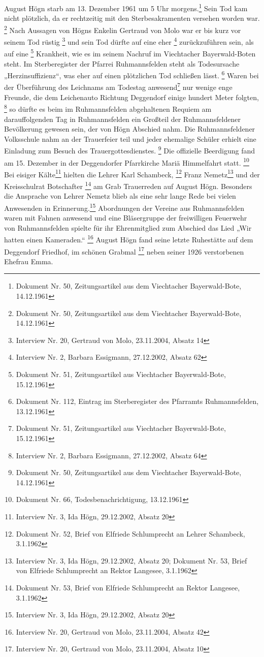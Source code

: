August Högn starb am 13. Dezember 1961 um 5 Uhr morgens.\footnote{
Dokument Nr. 50, Zeitungsartikel aus dem Viechtacher Bayerwald-Bote,
14.12.1961} Sein Tod kam nicht plötzlich, da er rechtzeitig mit den
Sterbesakramenten versehen worden war. \footnote{Dokument Nr. 50,
Zeitungsartikel aus dem Viechtacher Bayerwald-Bote, 14.12.1961} Nach
Aussagen von Högns Enkelin Gertraud von Molo war er bis kurz vor seinem
Tod rüstig \footnote{Interview Nr. 20, Gertraud von Molo, 23.11.2004,
Absatz 14} und sein Tod dürfte auf eine eher  \footnote{Interview Nr. 2, Barbara Essigmann, 27.12.2002,
Absatz 62} zurückzuführen sein, als auf eine   \footnote{Dokument Nr. 51, Zeitungsartikel aus Viechtacher
Bayerwald-Bote, 15.12.1961} Krankheit, wie es im seinem Nachruf im
Viechtacher Bayerwald-Boten steht. Im Sterberegister der Pfarrei
Ruhmannsfelden steht als Todesursache „Herzinsuffizienz“, was eher auf
einen plötzlichen Tod schließen lässt. \footnote{Dokument Nr. 112,
Eintrag im Sterberegister des Pfarramts Ruhmannsfelden, 13.12.1961}
Waren bei der Überführung des Leichnams am Todestag anwesend\footnote{
Dokument Nr. 51, Zeitungsartikel aus Viechtacher Bayerwald-Bote,
15.12.1961} nur wenige enge Freunde, die dem Leichenauto Richtung
Deggendorf einige hundert Meter folgten, \footnote{Interview Nr. 2,
Barbara Essigmann, 27.12.2002, Absatz 64} so dürfte es beim im
Ruhmannsfelden abgehaltenen Requiem am darauffolgenden Tag in
Ruhmannsfelden ein Großteil der Ruhmannsfeldener Bevölkerung gewesen
sein, der von Högn Abschied nahm. Die Ruhmannsfeldener Volksschule nahm
an der Trauerfeier teil und jeder ehemalige Schüler erhielt eine
Einladung zum Besuch des Trauergottesdienstes. \footnote{Dokument Nr.
50, Zeitungsartikel aus dem Viechtacher Bayerwald-Bote, 14.12.1961} Die
offizielle Beerdigung fand am 15. Dezember in der Deggendorfer
Pfarrkirche Mariä Himmelfahrt statt. \footnote{Dokument Nr. 66,
Todesbenachrichtigung, 13.12.1961} Bei eisiger Kälte\footnote{
Interview Nr. 3, Ida Högn, 29.12.2002, Absatz 20} hielten die Lehrer
Karl Schambeck, \footnote{Dokument Nr. 52, Brief von Elfriede
Schlumprecht an Lehrer Schambeck, 3.1.1962} Franz Nemetz\footnote{
Interview Nr. 3, Ida Högn, 29.12.2002, Absatz 20; Dokument Nr. 53,
Brief von Elfriede Schlumprecht an Rektor Langesee, 3.1.1962} und der
Kreisschulrat Botschafter \footnote{Dokument Nr. 53, Brief von Elfriede
Schlumprecht an Rektor Langesee, 3.1.1962} am Grab Trauerreden auf
August Högn. Besonders die Ansprache von Lehrer Nemetz blieb als eine
sehr lange Rede bei vielen Anwesenden in Erinnerung.\footnote{
Interview Nr. 3, Ida Högn, 29.12.2002, Absatz 20} Abordnungen der
Vereine aus Ruhmannsfelden waren mit Fahnen anwesend und eine
Bläsergruppe der freiwilligen Feuerwehr von Ruhmannsfelden spielte für
ihr Ehrenmitglied zum Abschied das Lied „Wir hatten einen Kameraden.“
 \footnote{Interview Nr. 20, Gertraud von Molo, 23.11.2004, Absatz 42}
August Högn fand seine letzte Ruhestätte auf dem Deggendorf Friedhof,
im schönen Grabmal \footnote{Interview Nr. 20, Gertraud von Molo,
23.11.2004, Absatz 10} neben seiner 1926 verstorbenen Ehefrau Emma.

